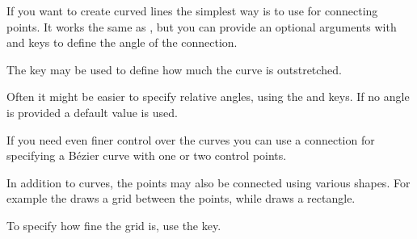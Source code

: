 If you want to create curved lines the simplest way is to use  for
connecting points. It works the same as \ltx{--}, but you can provide an optional arguments with  and  keys to define the angle of
the connection.
\begin{example}[vertical_mode, examplewidth=0.8\linewidth]
\tikzset{baseline} \vspace{-0.3cm} %
\vspace{-0.5cm} %
\end{example}
The  key may be used to define how much the curve is
outstretched.
\begin{example}[vertical_mode, examplewidth=0.8\linewidth]
\tikzset{baseline} \vspace{-1cm} %
\vspace{-1cm} %
\end{example}
Often it might be easier to specify relative angles, using the  and  keys. If no angle is provided a default value is
used.
\begin{example}[vertical_mode, examplewidth=0.8\linewidth]
\end{example}

If you need even finer control over the curves you can use a
 connection for specifying a Bézier curve with one
or two control points.
\begin{chktexignore}  
\begin{example}[vertical_mode, examplewidth=0.8\linewidth]
\vspace{-0.5cm} %
\end{example}
\end{chktexignore}

In addition to curves, the points may also be connected using various shapes.
For example the  draws a grid between the points, while
 draws a rectangle.
\begin{example}[vertical_mode, examplewidth=0.8\linewidth]
\end{example}
To specify how fine the grid is, use the  key.
\begin{example}[vertical_mode, examplewidth=0.8\linewidth]
\end{example}


